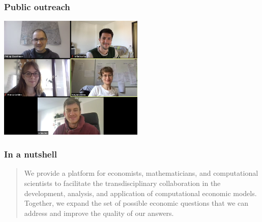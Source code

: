 
\begin{frame}\frametitle{Public outreach}

\centering
\includegraphics[width=0.52\textwidth]{material/crop-zoom-meeting.png}\\

\end{frame}

\begin{frame}\frametitle{In a nutshell}
\hspace{1.5cm}
\vspace{0.25cm}

\begin{quote}
	\large
	\raggedright
	\linespread{1.3}\selectfont{}
	We provide a platform for economists, mathematicians, and computational scientists to facilitate the \alert{transdisciplinary collaboration} in the development, analysis, and application of \alert{computational economic models}.
	\medskip \\
	Together, we \alert{expand the set} of possible economic questions that we can address and \alert{improve the quality} of our answers.
\end{quote}

\end{frame}

